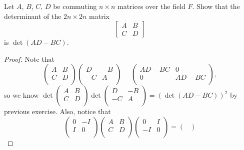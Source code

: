 \begin{problem}
Let $A$, $B$, $C$, $D$ be commuting $n \times n$ matrices over the field $F$. Show that the determinant of the $2n \times 2n$ matrix
$$
\begin{bmatrix}
A & B \\
C & D
\end{bmatrix}
$$
is $\det (AD - BC)$.
\end{problem}
\begin{proof}
    Note that 
    \[
        \begin{pmatrix}
            A & B  \\
            C & D  \\
        \end{pmatrix}\begin{pmatrix}
            D & -B  \\
            -C & A  \\
        \end{pmatrix} = \begin{pmatrix}
            AD-BC & 0  \\
            0 & AD-BC  \\
        \end{pmatrix},
    \] so we know \(\det \begin{pmatrix}
        A & B  \\
        C & D  \\
    \end{pmatrix} \det \begin{pmatrix}
        D & -B  \\
        -C & A  \\
    \end{pmatrix} = \left( \det (AD-BC) \right)^2 \) by previous exercise. Also, notice that 
    \[
        \begin{pmatrix}
            0 & -I  \\
            I & 0  \\
        \end{pmatrix}\begin{pmatrix}
            A & B  \\
            C & D  \\
        \end{pmatrix}\begin{pmatrix}
            0 & I  \\
            -I & 0  \\
        \end{pmatrix} = \begin{pmatrix}

\end{pmatrix}\]
\end{proof}
